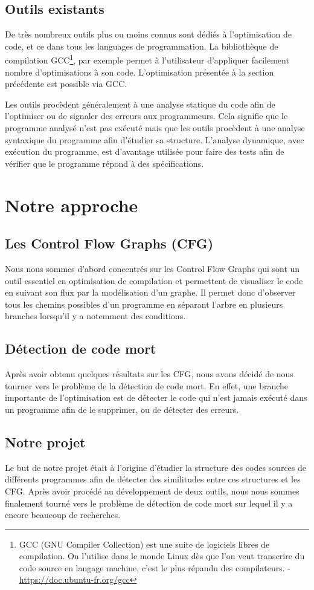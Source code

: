 \subsection{Outils existants}
De très nombreux outils plus ou moins connus sont dédiés à l'optimisation de code, et ce dans tous les languages de programmation. La bibliothèque de compilation GCC\footnote{GCC (GNU Compiler Collection) est une suite de logiciels libres de compilation. On l'utilise dans le monde Linux dès que l'on veut transcrire du code source en langage machine, c'est le plus répandu des compilateurs. - \url{https://doc.ubuntu-fr.org/gcc}}, par exemple permet à l'utilisateur d'appliquer facilement nombre d'optimisations à son code. L'optimisation présentée à la section précédente est possible via GCC.

Les outils procèdent généralement à une analyse statique du code afin de l'optimiser ou de signaler des erreurs aux programmeurs. Cela signifie que le programme analysé n'est pas exécuté mais que les outils procèdent à une analyse syntaxique du programme afin d'étudier sa structure. L'analyse dynamique, avec exécution du programme, est d'avantage utilisée pour faire des tests afin de vérifier que le programme répond à des spécifications.  


\section{Notre approche}
\subsection{Les Control Flow Graphs (CFG)}
Nous nous sommes d'abord concentrés sur les Control Flow Graphs qui sont un outil essentiel en optimisation de compilation et permettent de visualiser le code en suivant son flux par la modélisation d'un graphe. Il permet donc d'observer tous les chemins possibles d'un programme en séparant l'arbre en plusieurs branches lorsqu'il y a notemment des conditions.
\subsection{Détection de code mort}
Après avoir obtenu quelques résultats sur les CFG, nous avons décidé de nous tourner vers le problème de la détection de code mort. En effet, une branche importante de l'optimisation est de détecter le code qui n'est jamais exécuté dans un programme afin de le supprimer, ou de détecter des erreurs.
\subsection{Notre projet}
Le but de notre projet était à l'origine d'étudier la structure des codes sources de différents programmes afin de détecter des similitudes entre ces structures et les CFG. Après avoir procédé au développement de deux outils, nous nous sommes finalement tourné vers le problème de détection de code mort sur lequel il y a encore beaucoup de recherches.